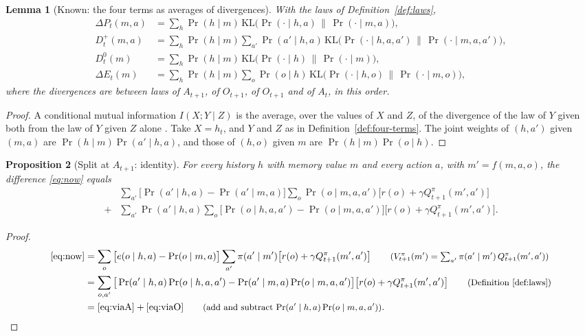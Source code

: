 \documentclass{article}
\newtheorem{proposition}{Proposition}[section]
\newtheorem{lemma}[proposition]{Lemma}
\theoremstyle{definition}
\numberwithin{equation}{section}
\newcommand{\KL}{\mathrm{KL}}
\newcommand{\dE}{\Delta E}
\newcommand{\dP}{\Delta P}
\newcommand{\why}[1]{\tag*{\small(#1)}}
\begin{document}
\begin{lemma}[Known: the four terms as averages of divergences]\label{lem:klforms}
With the laws of Definition~\ref{def:laws},
\begin{align*}
\dP_t(m,a)&=\sum_h\Pr(h\mid m)\,\KL\big(\Pr(\cdot\mid h,a)\,\big\|\,\Pr(\cdot\mid m,a)\big),\\
D^+_t(m,a)&=\sum_h\Pr(h\mid m)\sum_{a'}\Pr(a'\mid h,a)\,\KL\big(\Pr(\cdot\mid h,a,a')\,\big\|\,\Pr(\cdot\mid m,a,a')\big),\\
D^0_t(m)&=\sum_h\Pr(h\mid m)\,\KL\big(\Pr(\cdot\mid h)\,\big\|\,\Pr(\cdot\mid m)\big),\\
\dE_t(m)&=\sum_h\Pr(h\mid m)\sum_o\Pr(o\mid h)\,\KL\big(\Pr(\cdot\mid h,o)\,\big\|\,\Pr(\cdot\mid m,o)\big),
\end{align*}
where the divergences are between laws of $A_{t+1}$, of $O_{t+1}$, of $O_{t+1}$ and of $A_t$, in this order.
\end{lemma}

\begin{proof}
A conditional mutual information $I(X;Y\mid Z)$ is the average, over the values of $X$ and $Z$, of the divergence of the law of $Y$ given both from the law of $Y$ given $Z$ alone \citep[Ch.~2]{cover2006elements}. Take $X=h_t$, and $Y$ and $Z$ as in Definition~\ref{def:four-terms}. The joint weights of $(h,a')$ given $(m,a)$ are $\Pr(h\mid m)\Pr(a'\mid h,a)$, and those of $(h,o)$ given $m$ are $\Pr(h\mid m)\Pr(o\mid h)$.
\end{proof}

\begin{proposition}[Split at $A_{t+1}$: identity]\label{prop:id2}
For every history $h$ with memory value $m$ and every action $a$, with $m'=f(m,a,o)$, the difference \eqref{eq:now} equals
\begin{align}
&\sum_{a'}\big[\Pr(a'\mid h,a)-\Pr(a'\mid m,a)\big]\sum_o\Pr(o\mid m,a,a')\big[r(o)+\gamma Q^\pi_{t+1}(m',a')\big] \label{eq:viaA}\\
{}+{}&\sum_{a'}\Pr(a'\mid h,a)\sum_o\big[\Pr(o\mid h,a,a')-\Pr(o\mid m,a,a')\big]\big[r(o)+\gamma Q^\pi_{t+1}(m',a')\big]. \label{eq:viaO}
\end{align}
\end{proposition}

\begin{proof}
\begin{align*}
\eqref{eq:now}&=\sum_o\big[e(o\mid h,a)-\Pr(o\mid m,a)\big]\sum_{a'}\pi(a'\mid m')\big[r(o)+\gamma Q^\pi_{t+1}(m',a')\big] \why{$V^\pi_{t+1}(m')=\sum_{a'}\pi(a'\mid m')\,Q^\pi_{t+1}(m',a')$}\\
&=\sum_{o,a'}\big[\Pr(a'\mid h,a)\Pr(o\mid h,a,a')-\Pr(a'\mid m,a)\Pr(o\mid m,a,a')\big]\big[r(o)+\gamma Q^\pi_{t+1}(m',a')\big] \why{Definition~\ref{def:laws}}\\
&=\eqref{eq:viaA}+\eqref{eq:viaO} \why{add and subtract $\Pr(a'\mid h,a)\Pr(o\mid m,a,a')$}.
\end{align*}
\end{proof}
\end{document}
